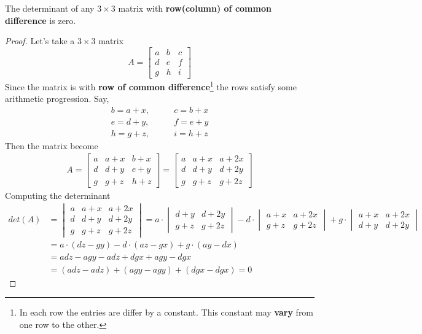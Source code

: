 \documentclass[12pt]{article}
\theoremstyle{definition}
\theoremstyle{remark}
\newcounter{lemma}
\newenvironment{lemma}[1][]
  {\begin{lemm}[mynote=#1]}
  {\end{lemm}}
\begin{document}
\begin{lemma}\label{lem}
The determinant of any $3\times 3$ matrix with \textbf{row(column) of common difference} is zero.
\end{lemma}
\begin{proof}
Let's take a $3\times3$ matrix
\[
  A = \begin{bmatrix}
      a  & b & c \\
      d  & e & f \\
      g  & h & i
    \end{bmatrix}
\]
Since the matrix is with \textbf{row of common difference}\footnote{In each row the entries are differ by a constant. This constant may \textbf{vary} from one row to the other.} the rows satisfy some arithmetic progression. Say,
\begin{align*}
b=a+x, &\qquad c=b+x\\
e=d+y, &\qquad f=e+y\\
h=g+z, &\qquad i=h+z
\end{align*}
Then the matrix become
\begin{align*}
  A =\begin{bmatrix}
      a  & a+x & b+x \\
      d  & d+y & e+y \\
      g  & g+z & h+z
    \end{bmatrix}
    =\begin{bmatrix}
      a  & a+x & a+2x \\
      d  & d+y & d+2y \\
      g  & g+z & g+2z
    \end{bmatrix}
\end{align*}
Computing the determinant
\begin{align*}
  det(A) &=\begin{vmatrix}
      a  & a+x & a+2x \\
      d  & d+y & d+2y \\
      g  & g+z & g+2z
    \end{vmatrix}
    =a\cdot\begin{vmatrix}
    d+y  & d+2y \\
     g+z  & g+2z
    \end{vmatrix}
    -d\cdot\begin{vmatrix}
    a+x  & a+2x \\g+z  & g+2z
    \end{vmatrix}
    +g\cdot\begin{vmatrix}
     a+x  & a+2x \\
     d+y  & d+2y
     \end{vmatrix}\\
&= a\cdot(dz-gy)-d\cdot(az-gx)+g\cdot(ay-dx)\\
&=adz-agy-a dz+dg x+a gy-d gx\\
&=(ad z-a dz)+(a gy-ag y)+(dg x-d gx)=0
\end{align*}
\end{proof}
\end{document}
